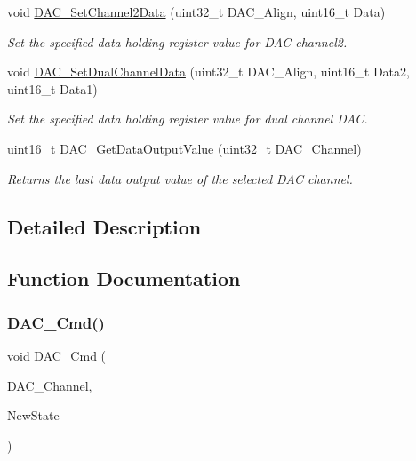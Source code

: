 \begin{DoxyCompactItemize}
void \mbox{\hyperlink{group___d_a_c___private___functions_ga44e12006ec186791378d132da8541552}{D\+A\+C\+\_\+\+Set\+Channel2\+Data}} (uint32\+\_\+t D\+A\+C\+\_\+\+Align, uint16\+\_\+t Data)
\begin{DoxyCompactList}\small\item\em Set the specified data holding register value for D\+AC channel2. \end{DoxyCompactList}\item 
void \mbox{\hyperlink{group___d_a_c___private___functions_ga4ca2cfdf56ab35a23f2517f23d7fbb24}{D\+A\+C\+\_\+\+Set\+Dual\+Channel\+Data}} (uint32\+\_\+t D\+A\+C\+\_\+\+Align, uint16\+\_\+t Data2, uint16\+\_\+t Data1)
\begin{DoxyCompactList}\small\item\em Set the specified data holding register value for dual channel D\+AC. \end{DoxyCompactList}\item 
uint16\+\_\+t \mbox{\hyperlink{group___d_a_c___private___functions_ga51274838de1e5dd012a82d7f44d7a50b}{D\+A\+C\+\_\+\+Get\+Data\+Output\+Value}} (uint32\+\_\+t D\+A\+C\+\_\+\+Channel)
\begin{DoxyCompactList}\small\item\em Returns the last data output value of the selected D\+AC channel. \end{DoxyCompactList}\end{DoxyCompactItemize}


\subsection{Detailed Description}


\subsection{Function Documentation}
\mbox{\label{group___d_a_c___private___functions_ga323e61530d7fa9396c3bce9edb61f733}} 
\subsubsection{\texorpdfstring{DAC\_Cmd()}{DAC\_Cmd()}}
{\footnotesize\ttfamily void D\+A\+C\+\_\+\+Cmd (\begin{DoxyParamCaption}\item[{uint32\+\_\+t}]{D\+A\+C\+\_\+\+Channel,  }\item[{\mbox{\hyperlink{group___exported__types_gac9a7e9a35d2513ec15c3b537aaa4fba1}{Functional\+State}}}]{New\+State }\end{DoxyParamCaption})}



